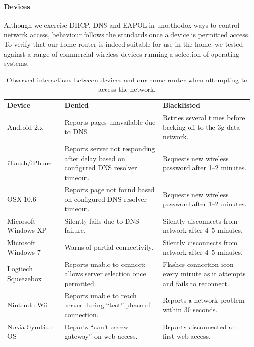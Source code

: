 \paragraph{Devices} Although we exercise DHCP, DNS and EAPOL in unorthodox ways
to control network access, behaviour follows the standards once a device is
permitted access.  To verify that our home router is indeed suitable for use in
the home, we tested against a range of commercial wireless devices running a
selection of operating systems. 

\begin{table} \centering\footnotesize
  \begin{tabular}{lp{}p{}} \bf Device & \bf Denied &
    \bf Blacklisted\\

Android 2.x & Reports pages unavailable due to DNS.  & Retries several times
before backing off to the 3g data network.\\

iTouch/iPhone & Reports server not responding after delay based on configured
DNS resolver timeout.  & Requests new wireless password after 1--2 minutes.\\

OSX 10.6 & Reports page not found based on configured DNS resolver timeout.  &
Requests new wireless password after 1--2 minutes.\\

Microsoft Windows XP & Silently fails due to DNS failure.  & Silently
disconnects from network after 4--5 minutes.\\

Microsoft Windows 7 & Warns of partial connectivity.  & Silently disconnects
from network after 4--5 minutes.\\

Logitech Squeezebox & Reports unable to connect; allows server selection once
permitted.  & Flashes connection icon every minute as it attempts and fails to
reconnect.  \\ 

Nintendo Wii & Reports unable to reach server during ``test'' phase of
connection.  & Reports a network problem within 30 seconds.\\

Nokia Symbian OS & Reports ``can't access gateway'' on web access.  & Reports
disconnected on first web access.\\ \end{tabular}
\caption{\label{t:devices}Observed interactions between devices and our home
  router when attempting to access the network.}
\end{table}

